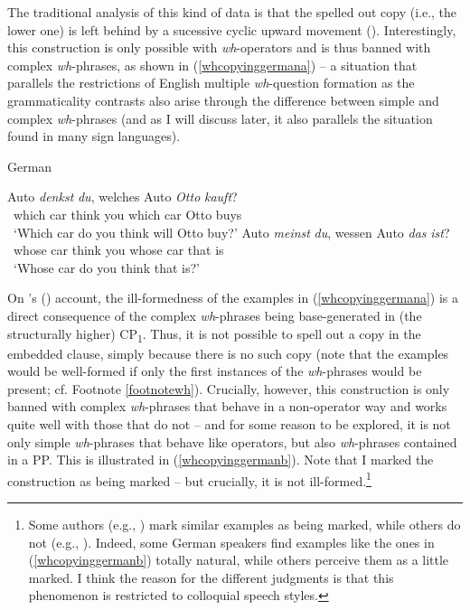 \noindent The traditional analysis of this kind of data is that the spelled out copy (i.e., the lower one) is left behind by a sucessive cyclic upward movement (\citealt{mcdaniel1986conditions, fanselow2000towards, hohle2000w, nunes2004linearization, schippers2012some, pankau2013replacing, bayer1984comp, bayer2014}). Interestingly, this construction is only possible with \textit{wh}-operators and is thus banned with complex \textit{wh}-phrases, as shown in (\ref{whcopyinggermana}) -- a situation that parallels the restrictions of English multiple \textit{wh}-question formation as the grammaticality contrasts also arise through the difference between simple and complex \textit{wh}-phrases (and as I will discuss later, it also parallels the situation found in many sign languages).





\begin{exe}
\ex German \label{whcopyinggermana} \begin{xlist}
\ex {} {Auto} {\textit{denkst}} {\textit{du},} {welches} {Auto} {\textit{Otto}} {\textit{kauft}?}   \\
{\textcolor{white}{*}which} {car} {think} {you} {which} {car} {Otto}  {buys}\\
\trans \textcolor{white}{*}`Which car do you think will Otto buy?' \label{ex:whcopyinggermanaa}\ex {}  {Auto}  {\textit{meinst}}  {\textit{du},}  {wessen}  {Auto}  {\textit{das}}  {\textit{ist}?} \\
{\textcolor{white}{*}whose} {car} {think} {you} {whose} {car} {that} {is} \\
\trans \textcolor{white}{*}`Whose car do you think that is?' \label{ex:whcopyinggermanab}
\end{xlist}
\end{exe}

\noindent On \citeauthor{van2010complex}'s (\citeyear{van2010complex, van2012you}) account, the ill-formedness of the examples in (\ref{whcopyinggermana}) is a direct consequence of the complex \textit{wh}-phrases being base-generated in (the structurally higher) CP\textsubscript{1}. Thus, it is not possible to spell out a copy in the embedded clause, simply because there is no such copy (note that the examples would be well-formed if only the first instances of the \textit{wh}-phrases would be present; cf. Footnote \ref{footnotewh}). Crucially, however, this construction is only banned with complex \textit{wh}-phrases that behave in a non-operator way and works quite well with those that do not -- and for some reason to be explored, it is not only simple \textit{wh}-phrases that behave like operators, but also \textit{wh}-phrases contained in a PP. This is illustrated in (\ref{whcopyinggermanb}). Note that I marked the construction as being marked -- but crucially, it is not ill-formed.\footnote{ Some authors (e.g., \citealt{felser2004wh}) mark similar examples as being marked, while others do not (e.g., \citealt{van2010complex}). Indeed, some German speakers find examples like the ones in (\ref{whcopyinggermanb}) totally natural, while others perceive them as a little marked. I think the reason for the different judgments is that this phenomenon is restricted to colloquial speech styles.}

